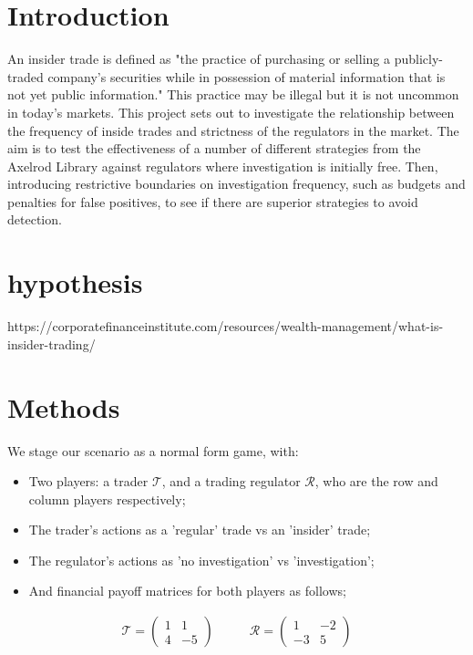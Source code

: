 \documentclass{article}
\begin{document}
\section{Introduction}
 An insider trade is defined as "the practice of purchasing or selling a publicly-traded company’s securities while in possession of material information that is not yet public information." This practice may be illegal but it is not uncommon in today's markets. This project sets out to investigate the relationship between the frequency of inside trades and strictness of the regulators in the market. The aim is to test the effectiveness of a number of different strategies from the Axelrod Library against regulators where investigation is initially free. Then, introducing restrictive boundaries on investigation frequency, such as budgets and penalties for false positives, to see if there are superior strategies to avoid detection.
 \section{hypothesis}
https://corporatefinanceinstitute.com/resources/wealth-management/what-is-insider-trading/

\section{Methods}

We stage our scenario as a normal form game, with:
\begin{itemize}
\item Two players: a trader $\mathcal{T}$, and a trading regulator $\mathcal{R}$, who are the row and column players respectively;
\item The trader's actions as a 'regular' trade vs an 'insider' trade;
\item The regulator's actions as 'no investigation' vs 'investigation';
\item And financial payoff matrices for both players as follows;
\end{itemize}
\begin{equation*}
\begin{split}
    \mathcal{T} = 
    \begin{pmatrix}
    1 & 1 \\
    4 & -5
    \end{pmatrix}
\end{split}
\quad\quad
\begin{split}
    \mathcal{R} = 
    \begin{pmatrix}
    1 & -2 \\
    -3 & 5
    \end{pmatrix}
\end{split}
\end{equation*}
\end{document}
